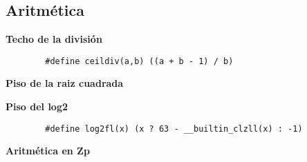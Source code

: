 \subsection{Aritmética}
    \textbf{Techo de la división}
    \begin{verbatim}
        #define ceildiv(a,b) ((a + b - 1) / b)
    \end{verbatim}

    \textbf{Piso de la raiz cuadrada}
    

    \textbf{Piso del log2}
    \begin{verbatim}
        #define log2fl(x) (x ? 63 - __builtin_clzll(x) : -1)
    \end{verbatim}

    \textbf{Aritmética en Zp}
    
